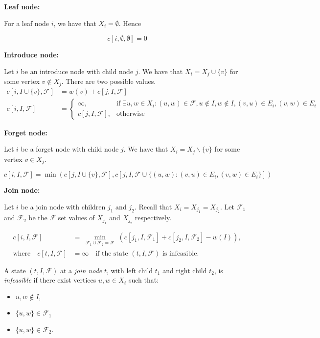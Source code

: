 \textbf{Leaf node:}

For a leaf node $i$, we have that $X_i = \emptyset$. Hence 

\[c[i, \emptyset, \emptyset] = 0\]

\textbf{Introduce node:}

Let $i$ be an introduce node with child node $j$. We have that $X_i = X_j \cup \{v\}$ for some 
vertex $v \notin X_j$. There are two possible values.
\[
\begin{aligned}
    c[i, I \cup \{v\}, \mathcal{F}] &= w(v) + c[j, I, \mathcal{F}] \\
    c[i, I, \mathcal{F}] &= 
    \begin{cases}
        \infty, & \text{if } \exists u, w \in X_i: (u, w) \in \mathcal{F}, u \notin I, w \notin I, (v, u) \in E_i, (v, w) \in E_i \\
        c[j, I, \mathcal{F}], & \text{otherwise}
    \end{cases}
\end{aligned}
\]

\textbf{Forget node:}

Let $i$ be a forget node with child node $j$. We have that $X_i = X_j \backslash \{v\}$ for 
some vertex $v \in X_j$.

\[c[i, I, \mathcal{F}] = \min(c[j, I \cup \{v\}, \mathcal{F}],
c[j, I, \mathcal{F} \cup \{(u, w): (v,u) \in E_i, (v, w) \in E_i\}])\]

\textbf{Join node:}

Let $i$ be a join node with children $j_1$ and $j_2$. Recall that $X_i = X_{j_1} = X_{j_2}$. 
Let $\mathcal{F}_1$ and $\mathcal{F}_2$ be the $\mathcal{F}$ set values of $X_{j_1}$ and $X_{j_2}$ respectively.

\begin{align*}
c[i, I, \mathcal{F}] 
&= \min_{\substack{\mathcal{F}_1 \cup \mathcal{F}_2 = \mathcal{F}}} 
\left( 
  c[j_1, I, \mathcal{F}_1] + c[j_2, I, \mathcal{F}_2] - w(I) 
\right), \\
\text{where} \quad
c[t, I, \mathcal{F}] 
&= \infty \quad \text{if the state } (t, I, \mathcal{F}) \text{ is infeasible}.
\end{align*}

A state \( (t, I, \mathcal{F}) \) at a \emph{join node} \( t \), 
with left child \( t_1 \) and 
right child \( t_2 \), is \emph{infeasible} if there exist vertices \( u, w \in X_t \) such that:
\begin{itemize}
    \item \( u, w \notin I \),
    \item \( \{u, w\} \in \mathcal{F}_1 \)
    \item \( \{u, w\} \in \mathcal{F}_2 \).
\end{itemize}

